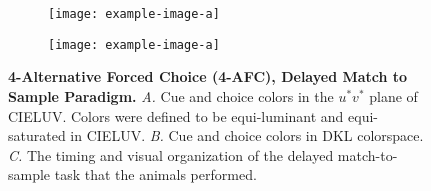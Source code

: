 \begin{figure}
    \centering
    \begin{subfigure}[b]{0.3\textwidth}
         \centering
         \caption{}
         
         \label{fig:StimuliChromaticities}
    \end{subfigure}
    \hfill
    \begin{subfigure}[b]{0.65\textwidth}
         \centering
         \caption{}
         
         \label{fig:epochs}
    \end{subfigure}

    \begin{subfigure}[b]{0.20\textwidth}
         \centering
         \caption{}
         
         \label{fig:Bias1}
    \end{subfigure}
        \hfill
    \begin{subfigure}[b]{0.20\textwidth}
         \centering
         \caption{}
         
         \label{fig:Bias2}
    \end{subfigure}
    \hfill
    \begin{subfigure}[b]{0.20\textwidth}
         \centering
         \caption{}
         \texttt{[image: example-image-a]}
         \label{fig:BiasLinear}
    \end{subfigure}
    \hfill
    \begin{subfigure}[b]{0.20\textwidth}
         \centering
         \caption{}
         \texttt{[image: example-image-a]}
         \label{fig:BiasPredictions}
    \end{subfigure}
    
    \caption{\textbf{4-Alternative Forced Choice (4-AFC), Delayed Match to Sample Paradigm.}
    \emph{A.} Cue and choice colors in the $u^*v^*$ plane of CIELUV. Colors were defined to be equi-luminant and equi-saturated in CIELUV.
    \emph{B.} Cue and choice colors in DKL colorspace.
    \emph{C.} The timing and visual organization of the delayed match-to-sample task that the animals performed.
} 
    \label{fig:ParadigmAnalysisPredictions}
    
\end{figure}

